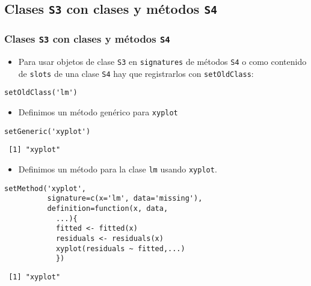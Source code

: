 \documentclass[xcolor={usenames,svgnames,dvipsnames}]{beamer}
\begin{document}
\subsection{Clases \texttt{S3} con clases y métodos \texttt{S4}}
\label{sec-3-3}
\begin{frame}[fragile]
\frametitle{Clases \texttt{S3} con clases y métodos \texttt{S4}}
\label{sec-3-3-1}

\begin{itemize}
\item Para usar objetos de clase \texttt{S3} en \texttt{signatures} de métodos \texttt{S4} o
  como contenido de \texttt{slots} de una clase \texttt{S4} hay que registrarlos con
  \texttt{setOldClass}:
\end{itemize}

\lstset{language=R}
\begin{lstlisting}
setOldClass('lm')
\end{lstlisting}


\begin{itemize}
\item Definimos un método genérico para \texttt{xyplot}
\end{itemize}

\lstset{language=R}
\begin{lstlisting}
setGeneric('xyplot')
\end{lstlisting}

\begin{verbatim}
 [1] "xyplot"
\end{verbatim}

\begin{itemize}
\item Definimos un método para la clase \texttt{lm} usando \texttt{xyplot}.
\end{itemize}

\lstset{language=R}
\begin{lstlisting}
setMethod('xyplot',
          signature=c(x='lm', data='missing'),
          definition=function(x, data,
            ...){
            fitted <- fitted(x)
            residuals <- residuals(x)
            xyplot(residuals ~ fitted,...)
            })
\end{lstlisting}

\begin{verbatim}
 [1] "xyplot"
\end{verbatim}
\end{frame}
\end{document}
